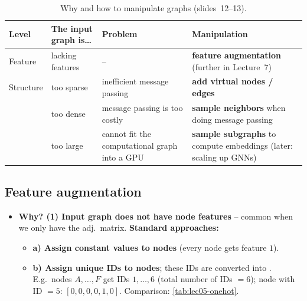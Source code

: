 \begin{table}[htbp]
  \centering\small
  \caption{Why and how to manipulate graphs (slides~12--13).}
  \label{tab:lec05-manip}
  \renewcommand{\arraystretch}{1.2}
  \begin{tabularx}{\textwidth}{@{}ll>{\raggedright\arraybackslash}X>{\raggedright\arraybackslash}X@{}}
    \toprule
    Level & The input graph is\dots & Problem & Manipulation\\
    \midrule
    Feature & lacking features & -- & \textbf{feature augmentation} (further
      in Lecture~7)\\
    Structure & too sparse & inefficient message passing & \textbf{add virtual
      nodes / edges}\\
    & too dense & message passing is too costly & \textbf{sample neighbors}
      when doing message passing\\
    & too large & cannot fit the computational graph into a GPU &
      \textbf{sample subgraphs} to compute embeddings (later: scaling up GNNs)\\
    \bottomrule
  \end{tabularx}
\end{table}

\subsection{Feature augmentation}\label{sec:lec05-feat}

\begin{itemize}
  \item \textbf{Why? (1) Input graph does not have node features} -- common
    when we only have the adj.\ matrix. \textbf{Standard approaches:}
    \begin{itemize}
      \item \textbf{a) Assign constant values to nodes} (every node gets
        feature $1$).
      \item \textbf{b) Assign unique IDs to nodes}; these IDs are converted
        into . E.g.\ nodes $A,\dots,F$ get IDs $1,\dots,6$
        (total number of IDs $=6$); node with ID $=5$: $[0,0,0,0,1,0]$.
        Comparison: \cref{tab:lec05-onehot}.
    \end{itemize}
\end{itemize}

